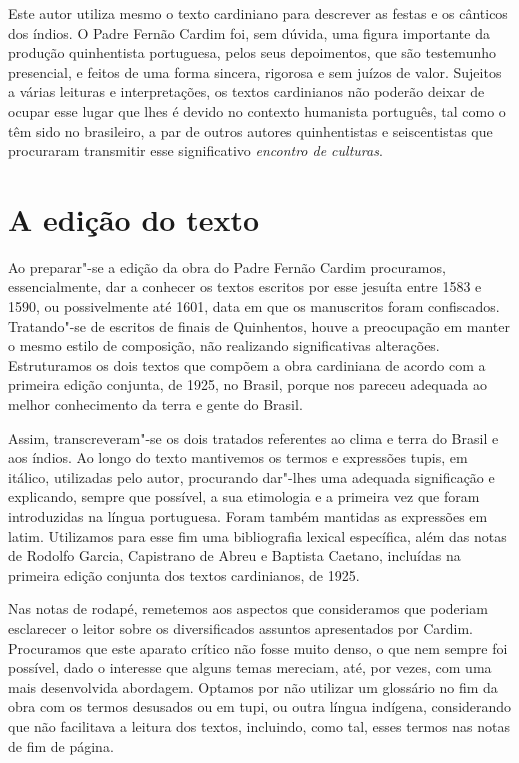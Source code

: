 Este autor utiliza mesmo o texto cardiniano para descrever as festas e os cânticos dos índios. 
O Padre Fernão Cardim foi, sem dúvida, uma figura importante da
produção quinhentista portuguesa, pelos seus depoimentos, que são
testemunho presencial, e feitos de uma forma sincera, rigorosa e sem
juízos de valor. Sujeitos a várias leituras e interpretações, os textos
cardinianos não poderão deixar de ocupar esse lugar que lhes é devido
no contexto humanista português, tal como o têm sido no brasileiro, a
par de outros autores quinhentistas e seiscentistas que procuraram
transmitir esse significativo \textit{encontro de culturas}. 

\section*{A edição do texto}

 Ao preparar"-se a edição da obra do Padre Fernão Cardim
procuramos, essencialmente, dar a conhecer os textos escritos por esse
jesuíta entre 1583 e 1590, ou possivelmente até 1601, data em que os
manuscritos foram confiscados. Tratando"-se de escritos de finais de
Quinhentos, houve a preocupação em manter o mesmo estilo de composição,
não realizando significativas alterações. Estruturamos os dois textos
que compõem a obra cardiniana de acordo com a primeira edição conjunta,
de 1925, no Brasil, porque nos pareceu adequada ao melhor conhecimento
da terra e gente do Brasil.

Assim, transcreveram"-se os dois tratados 
referentes ao clima e terra do Brasil e aos índios.
Ao longo do texto mantivemos os termos e expressões tupis, em
itálico, utilizadas pelo autor, procurando dar"-lhes uma adequada
significação e explicando, sempre que possível, a sua etimologia e a
primeira vez que foram introduzidas na língua portuguesa. Foram também
mantidas as expressões em latim. Utilizamos para esse fim uma
bibliografia lexical específica, além das notas de Rodolfo Garcia,
Capistrano de Abreu e Baptista Caetano, incluídas na primeira edição
conjunta dos textos cardinianos, de 1925.

Nas notas de rodapé, remetemos aos aspectos que consideramos que
poderiam esclarecer o leitor sobre os diversificados assuntos
apresentados por Cardim. Procuramos que este aparato crítico não fosse
muito denso, o que nem sempre foi possível, dado o interesse que alguns
temas mereciam, até, por vezes, com uma mais desenvolvida abordagem.
Optamos por não utilizar um glossário no fim da obra com os termos
desusados ou em tupi, ou outra língua indígena, considerando que não
facilitava a leitura dos textos, incluindo, como tal, esses termos nas
notas de fim de página. 

